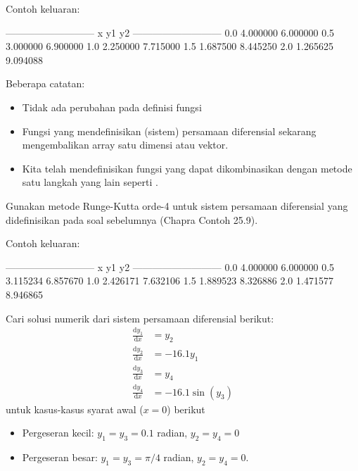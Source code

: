 Contoh keluaran:
\begin{textcode}
---------------------------
   x       y1         y2
---------------------------
  0.0   4.000000   6.000000
  0.5   3.000000   6.900000
  1.0   2.250000   7.715000
  1.5   1.687500   8.445250
  2.0   1.265625   9.094088
\end{textcode}

Beberapa catatan:
\begin{itemize}
\item Tidak ada perubahan pada definisi fungsi 
\item Fungsi yang mendefinisikan (sistem) persamaan diferensial sekarang
mengembalikan array satu dimensi atau vektor.
\item Kita telah mendefinisikan fungsi  yang dapat dikombinasikan
dengan metode satu langkah yang lain seperti .
\end{itemize}

\begin{soal}
Gunakan metode Runge-Kutta orde-4 untuk sistem persamaan diferensial yang didefinisikan
pada soal sebelumnya (Chapra Contoh 25.9).
\end{soal}

Contoh keluaran:
\begin{textcode}
---------------------------
   x        y1         y2
---------------------------
  0.0   4.000000   6.000000
  0.5   3.115234   6.857670
  1.0   2.426171   7.632106
  1.5   1.889523   8.326886
  2.0   1.471577   8.946865
\end{textcode}



\begin{soal}
Cari solusi numerik dari sistem persamaan diferensial berikut:
\begin{align*}
\frac{\mathrm{d}y_1}{\mathrm{d}x} & = y_2 \\
\frac{\mathrm{d}y_2}{\mathrm{d}x} & = -16.1 y_1 \\
\frac{\mathrm{d}y_3}{\mathrm{d}x} & = y_4 \\
\frac{\mathrm{d}y_4}{\mathrm{d}x} & = -16.1 \sin(y_3)
\end{align*}
untuk kasus-kasus syarat awal ($x=0$) berikut
\begin{itemize}
\item Pergeseran kecil: $y_1 = y_3 = 0.1$ radian, $y_2 = y_4 = 0$
\item Pergeseran besar: $y_1 = y_3 = \pi/4$ radian, $y_2 = y_4 = 0$.
\end{itemize}
\end{soal}


